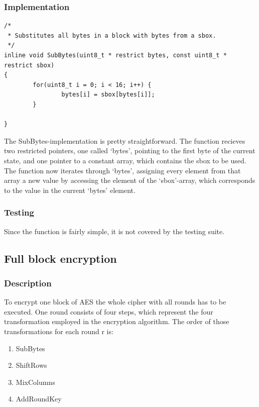 \hypertarget{implementation-4}{%
\subsubsection{Implementation}\label{implementation-4}}

\begin{lstlisting}
/*
 * Substitutes all bytes in a block with bytes from a sbox.
 */
inline void SubBytes(uint8_t * restrict bytes, const uint8_t * restrict sbox)
{
        for(uint8_t i = 0; i < 16; i++) {
                bytes[i] = sbox[bytes[i]];
        }
    
}
\end{lstlisting}

The SubBytes-implementation is pretty straightforward. The function
recieves two restricted pointers, one called `bytes', pointing to the
first byte of the current state, and one pointer to a constant array,
which contains the sbox to be used. The function now iterates through
`bytes', assigning every element from that array a new value by
accessing the element of the `sbox'-array, which corresponds to the
value in the current `bytes' element.

\hypertarget{testing-5}{%
\subsubsection{Testing}\label{testing-5}}

Since the function is fairly simple, it is not covered by the testing
suite.

\hypertarget{full-block-encryption}{%
\subsection{Full block encryption}\label{full-block-encryption}}

\hypertarget{description-6}{%
\subsubsection{Description}\label{description-6}}

To encrypt one block of AES the whole cipher with all rounds has to be
executed. One round consists of four steps, which represent the four
transformation employed in the encryption algorithm. The order of those
transformations for each round r is:

\begin{enumerate}
\def\labelenumi{\arabic{enumi}.}

\item
  SubBytes
\item
  ShiftRows
\item
  MixColumns
\item
  AddRoundKey
\end{enumerate}

